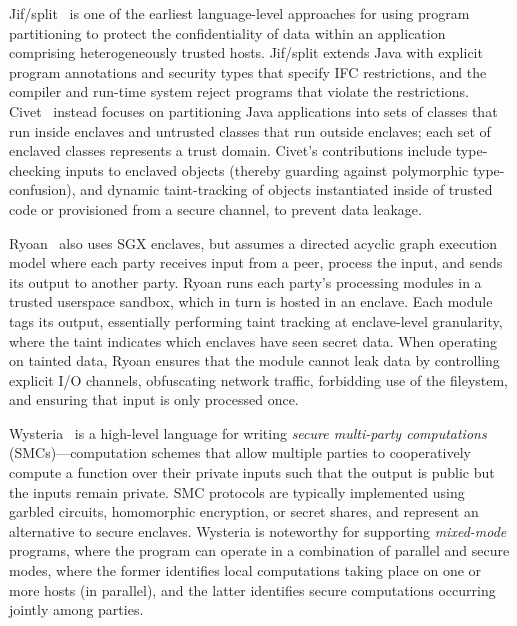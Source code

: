 %
%
Jif/split~\cite{jif} is one of the earliest language-level approaches for using
program partitioning to protect the confidentiality of data within an
application comprising heterogeneously trusted hosts.
%
Jif/split extends Java with explicit program annotations and security types
that specify IFC restrictions, and the compiler and run-time system reject
programs that violate the restrictions. 
%
Civet~\cite{civet} instead focuses on partitioning Java applications into sets of classes
that run inside enclaves and untrusted classes that run outside enclaves; each
set of enclaved classes represents a trust domain.
Civet's contributions include type-checking inputs to enclaved
objects (thereby guarding against polymorphic type-confusion), and dynamic
taint-tracking of objects instantiated inside of trusted code or provisioned
from a secure channel, to prevent data leakage.


Ryoan~\cite{ryoan} also uses SGX enclaves, but assumes a directed acyclic graph
execution model where each party receives input from a peer, process the input,
and sends its output to another party.
%
Ryoan runs each party's processing modules in a trusted userspace sandbox,
which in turn is hosted in an enclave.
%
Each module tags its output, essentially performing taint tracking at
enclave-level granularity, where the taint indicates which enclaves have seen
secret data.
%
When operating on tainted data, Ryoan ensures that the module cannot leak data
by controlling explicit I/O channels, obfuscating network traffic, forbidding
use of the fileystem, and ensuring that input is only processed once.


Wysteria~\cite{wysteria} is a high-level language for writing \emph{secure
multi-party computations} (SMCs)---computation schemes that allow
multiple parties to cooperatively compute a function over their private
inputs such that the output is public but the inputs remain private. 
%
SMC protocols are typically implemented using garbled circuits, homomorphic
encryption, or secret shares, and represent an alternative to secure enclaves.
%
Wysteria is noteworthy for supporting \emph{mixed-mode} programs, where the
program can operate in a combination of parallel and secure modes, where the
former identifies local computations taking place on one or more hosts (in
parallel), and the latter identifies secure computations occurring
jointly among parties. 
%


